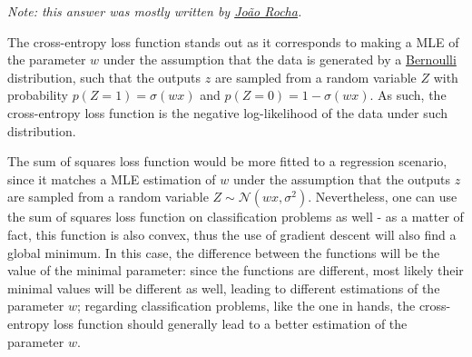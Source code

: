 \documentclass[12pt]{article}
\begin{document}
\begin{enumerate}[leftmargin=\labelsep]
  \textit{Note: this answer was mostly written by \href{https://github.com/Calhau18}{João Rocha}.}

  The cross-entropy loss function stands out as it corresponds to making a MLE of
  the parameter $w$ under the assumption that the data is generated by a
  \href{https://resumos.leic.pt/pe/va-discretas#distribuição-de-bernoulli}{Bernoulli}
  distribution, such that the outputs $z$ are sampled from a random variable $Z$
  with probability $p(Z = 1) = \sigma(w x)$ and $p(Z = 0) = 1 - \sigma(w x)$.
  As such, the cross-entropy loss function is the negative log-likelihood
  of the data under such distribution.

  The sum of squares loss function would be more fitted to a regression scenario,
  since it matches a MLE estimation of $w$ under the assumption that the outputs
  $z$ are sampled from a random variable $Z \sim \mathcal{N} (wx, \sigma^2)$.
  Nevertheless, one can use the sum of squares loss function on classification problems as well - as
  a matter of fact, this function is also convex, thus the use of gradient descent
  will also find a global minimum. In this case, the difference between the functions
  will be the value of the minimal parameter: since the functions are different,
  most likely their minimal values will be different as well, leading to different
  estimations of the parameter $w$; regarding classification problems, like the one
  in hands, the cross-entropy loss function should generally lead to a better estimation
  of the parameter $w$.

\end{enumerate}
\end{document}
